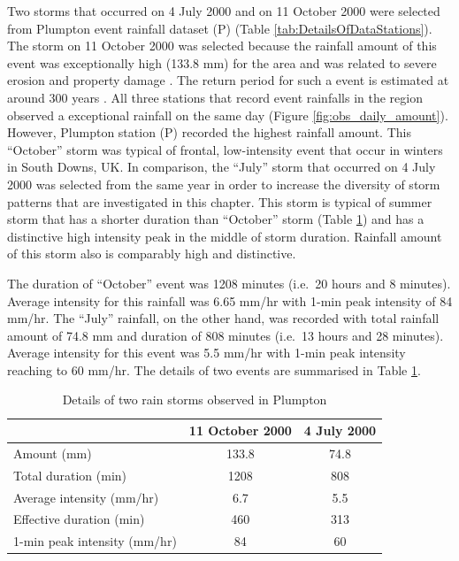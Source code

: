 Two storms that occurred on 4 July 2000 and on 11 October 2000 were selected
from Plumpton event rainfall dataset (P) (Table
\ref{tab:DetailsOfDataStations}). The storm on 11 October 2000 was selected
because the rainfall amount of this event was exceptionally high (133.8 mm) for
the area and was related to severe erosion and property damage
\citep{boardman2001-346}. The return period for such a event is estimated at
around 300 years \citep{saunders2001-360}. All three stations that record event
rainfalls in the region observed a exceptional rainfall on the same day (Figure
\ref{fig:obs_daily_amount}). However, Plumpton station (P) recorded the highest
rainfall amount. This ``October'' storm was typical of frontal, low-intensity
event that occur in winters in South Downs, UK. In comparison, the ``July''
storm that occurred on 4 July 2000 was selected from the same year in order to
increase the diversity of storm patterns that are investigated in this chapter.
This storm is typical of summer storm that has a shorter duration than
``October'' storm (Table \ref{tab:DetailsoftworainstormsobservedinPlumpton}) and
has a distinctive high intensity peak in the middle of storm duration. Rainfall
amount of this storm also is comparably high and distinctive.

The duration of ``October'' event was 1208 minutes (i.e.\ 20 hours and 8
minutes). Average intensity for this rainfall was 6.65 mm/hr with 1-min peak
intensity of 84 mm/hr. The ``July'' rainfall, on the other hand, was recorded
with total rainfall amount of 74.8 mm and duration of 808 minutes (i.e.\ 13
hours and 28 minutes). Average intensity for this event was 5.5 mm/hr with
1-min peak intensity reaching to 60 mm/hr. The details of two events are
summarised in Table \ref{tab:DetailsoftworainstormsobservedinPlumpton}.

\begin{table}[htbp]
  \centering
  \small
  \caption{Details of two rain storms observed in Plumpton}
  \label{tab:DetailsoftworainstormsobservedinPlumpton}
    \begin{tabular}{lcc}
    \toprule
     & 11 October 2000 & 4 July 2000 \\
    \midrule
    Amount (mm) & 133.8 & 74.8\\
    Total duration (min) & 1208 & 808 \\
    Average intensity (mm/hr) & 6.7 & 5.5 \\
    Effective duration (min) & 460 & 313 \\
    1-min peak intensity (mm/hr) & 84 & 60 \\
    \bottomrule
    \end{tabular}
\end{table}

